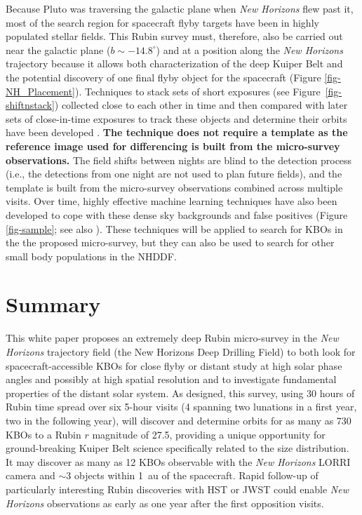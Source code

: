 \documentclass[modern,linenumbers,trackchanges,preprint]{aastex631}
\begin{document}
Because Pluto was traversing the galactic plane when {\it New Horizons} flew past it, most of the search region for spacecraft flyby targets have been in highly populated stellar fields. This Rubin survey must, therefore, also be carried out near the galactic plane ($b \sim -14.8^\circ$) and at a position along the {\it New Horizons} trajectory because it allows both characterization of the deep Kuiper Belt and the potential discovery of one final flyby object for the spacecraft (Figure \ref{fig-NH_Placement}). 
Techniques to stack sets of short exposures (see Figure~\ref{fig-shiftnstack}) collected close to each other in time and then compared with later sets of close-in-time exposures to track these objects and determine their orbits have been developed \citep{Fraser2024LPI, Yoshida2024}.
\textbf{The technique does not require a template as the reference image used for differencing is built from the micro-survey observations.} The field shifts between nights are blind to the detection process (i.e., the detections from one night are not used to plan future fields), and the template is built from the micro-survey observations combined across multiple visits. 
Over time, highly effective machine learning techniques have also been developed to cope with these dense sky backgrounds and false positives (Figure \ref{fig-sample}; see also \citet{Napier2023,Buie2024,Fraser2024PSJ}). 
These techniques will be applied to search for KBOs in the the proposed micro-survey, but they can also be used to search for other small body populations in the NHDDF. 


\section{Summary}
This white paper proposes an extremely deep Rubin micro-survey in the {\it New Horizons} trajectory field (the New Horizons Deep Drilling Field) to both look for spacecraft-accessible KBOs for close flyby or distant study at high solar phase angles and possibly at high spatial resolution and to investigate fundamental properties of the distant solar system. As designed, this survey, using 30 hours of Rubin time spread over six 5-hour visits (4 spanning two lunations in a first year, two in the following year), will discover and determine orbits for as many as 730 KBOs to a Rubin $r$ magnitude of 27.5, providing a unique opportunity for ground-breaking Kuiper Belt science specifically related to the size distribution. It may discover as many as 12 KBOs observable with the {\it New Horizons} LORRI camera and $\sim$3 objects within 1~au of the spacecraft. Rapid follow-up of particularly interesting Rubin discoveries with HST or JWST could enable {\it New Horizons} observations as early as one year after the first opposition visits. 
\end{document}
